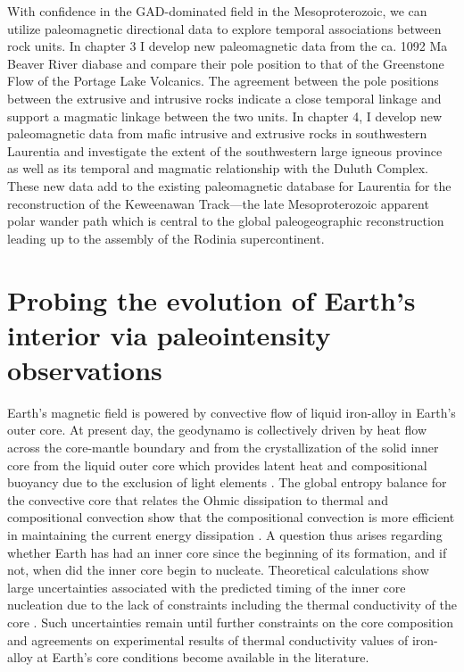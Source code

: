 With confidence in the GAD-dominated field in the Mesoproterozoic, we can utilize paleomagnetic directional data to explore temporal associations between rock units. In chapter 3 I develop new paleomagnetic data from the ca. 1092 Ma Beaver River diabase and compare their pole position to that of the Greenstone Flow of the Portage Lake Volcanics. The agreement between the pole positions between the extrusive and intrusive rocks indicate a close temporal linkage and support a magmatic linkage between the two units. In chapter 4, I develop new paleomagnetic data from mafic intrusive and extrusive rocks in southwestern Laurentia and investigate the extent of the southwestern large igneous province as well as its temporal and magmatic relationship with the Duluth Complex. These new data add to the existing paleomagnetic database for Laurentia for the reconstruction of the Keweenawan Track---the late Mesoproterozoic apparent polar wander path which is central to the global paleogeographic reconstruction leading up to the assembly of the Rodinia supercontinent. 

\section{Probing the evolution of Earth's interior via paleointensity observations}

Earth's magnetic field is powered by convective flow of liquid iron-alloy in Earth's outer core. At present day, the geodynamo is collectively driven by heat flow across the core-mantle boundary and from the crystallization of the solid inner core from the liquid outer core which provides latent heat and compositional buoyancy due to the exclusion of light elements \citep{Buffett2000a}. The global entropy balance for the convective core that relates the Ohmic dissipation to thermal and compositional convection show that the compositional convection is more efficient in maintaining the current energy dissipation \citep{Labrosse2003a, Landeau2022a}. A question thus arises regarding whether Earth has had an inner core since the beginning of its formation, and if not, when did the inner core begin to nucleate. Theoretical calculations show large uncertainties associated with the predicted timing of the inner core nucleation \citep[e.g.][]{Buffett2003a, Pozzo2012a, Nimmo2015a} due to the lack of constraints including the thermal conductivity of the core \citep{Gubbins2004a, Konopkova2016a, Ohta2016a}. Such uncertainties remain until further constraints on the core composition and agreements on experimental results of thermal conductivity values of iron-alloy at Earth's core conditions become available in the literature. 

